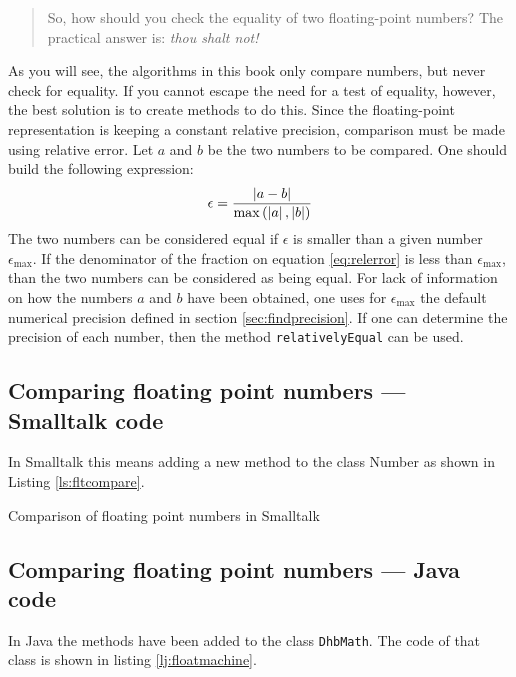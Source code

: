 \documentclass[twoside]{book}
\begin{document}
\begin{quote}
So, how should you check the equality of two floating-point
numbers? \linebreak\noindent\hfil The practical answer is: {\sl
thou shalt not!}
\end{quote}

\noindent As you will see, the algorithms in this book only
compare numbers, but never check for equality. If you cannot
escape the need for a test of equality, however, the best solution
is to create methods to do this. Since the floating-point
representation is keeping a constant relative precision,
comparison must be made using relative error. Let $a$ and $b$ be
the two numbers to be compared. One should build the following
expression:
\begin{equation}
\label{eq:relerror}
\epsilon={\left|a-b\right| \over
\max\left(\left|a\right|,\left|b\right|\right)}
\end{equation}
The two numbers can be considered equal if $\epsilon$ is smaller
than a given number $\epsilon_{\max}$. If the denominator of the
fraction on equation \ref{eq:relerror} is less than
$\epsilon_{\max}$, than the two numbers can be considered as being
equal. For lack of information on how the numbers $a$ and $b$ have
been obtained, one uses for $\epsilon_{\max}$ the default
numerical precision defined in section \ref{sec:findprecision}. If
one can determine the precision of each number, then the method
{\tt relativelyEqual} can be used.

\subsection{Comparing floating point numbers --- Smalltalk code}
In Smalltalk this means adding a new method to the class Number as
shown in Listing \ref{ls:fltcompare}.

\begin{listing}
Comparison of floating point numbers in Smalltalk
\label{ls:fltcompare}

\end{listing}

\subsection{Comparing floating point numbers --- Java code}
\label{sec:eqfltjava} In Java the methods have been added to the
class {\tt DhbMath}. The code of that class is shown in listing
\ref{lj:floatmachine}.
\end{document}
